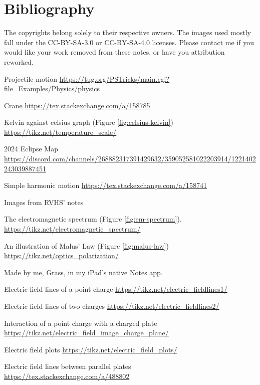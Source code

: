 \documentclass[oneside]{book}
\begin{document}
\chapter{Bibliography}
The copyrights belong solely to their respective owners. The images used mostly fall under the CC-BY-SA-3.0 or CC-BY-SA-4.0 licenses. Please contact me if you would like your work removed from these notes, or have you attribution reworked. 
\begin{enumerate}[label={[\arabic*]}]
    \item\label{Projectile motion} Projectile motion \url{https://tug.org/PSTricks/main.cgi?file=Examples/Physics/physics}
    \item\label{Crane} Crane \url{https://tex.stackexchange.com/a/158785}
    \item\label{source:celsius-kelvin} Kelvin against celsius graph (Figure \ref{fig:celsius-kelvin}) \url{https://tikz.net/temperature_scale/} 
    \item\label{2024 Eclipse Map} 2024 Eclipse Map \url{https://discord.com/channels/268882317391429632/359052581022203914/1221402243039887451}
    \item\label{Simple harmonic motion} Simple harmonic motion \url{https://tex.stackexchange.com/a/158741}
    \item\label{RVHS} Images from RVHS' notes
    \item\label{source:em-spectrum} The electromagnetic spectrum (Figure \ref{fig:em-spectrum}). \url{https://tikz.net/electromagnetic_spectrum/}
    \item\label{source:malus-law} An illustration of Malus' Law (Figure \ref{fig:malus-law}) \url{https://tikz.net/optics_polarization/} 
    \item\label{Me} Made by me, Grass, in my iPad's native Notes app.
    \item\label{Electric field lines of a point charge} Electric field lines of a point charge \url{https://tikz.net/electric_fieldlines1/}
    \item\label{Electric field lines of two charges} Electric field lines of two charges \url{https://tikz.net/electric_fieldlines2/}
    \item\label{Interaction of a point charge with a charged plate} Interaction of a point charge with a charged plate \url{https://tikz.net/electric_field_image_charge_plane/}
    \item\label{Electric field plots} Electric field plots \url{https://tikz.net/electric_field_plots/}
    \item\label{Electric field lines between parallel plates} Electric field lines between parallel plates \url{https://tex.stackexchange.com/a/488802}

\end{enumerate}
\end{document}
